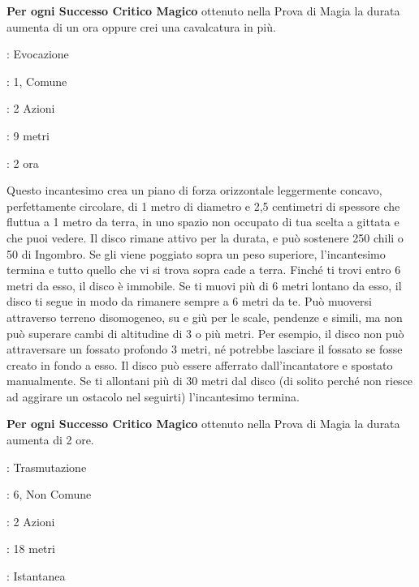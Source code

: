 \begin{multicols}{2}
\textbf{Per ogni Successo Critico Magico} ottenuto nella Prova di Magia la durata aumenta di un ora oppure crei una cavalcatura in più.

\noindent\colorbox{OBSSgold!10}{
\begin{minipage}{0.95\linewidth}
\begin{description}[noitemsep, topsep=0pt, parsep=0pt, partopsep=0pt, leftmargin=0cm, labelwidth=1.3cm]
	\item[\textbf{Lista}]: Evocazione
	\item[\textbf{Livello}]: 1, Comune
	\item[\textbf{Lancio}]: 2 Azioni
	\item[\textbf{Gittata}]: 9 metri
	\item[\textbf{Durata}]: 2 ora
\end{description}
\end{minipage}}\smallskip

Questo incantesimo crea un piano di forza orizzontale leggermente concavo, perfettamente circolare, di 1 metro di diametro e 2,5 centimetri di spessore che fluttua a 1 metro da terra, in uno spazio non occupato di tua scelta a gittata e che puoi vedere. Il disco rimane attivo per la durata, e può sostenere 250 chili o 50 di Ingombro. Se gli viene poggiato sopra un peso superiore, l'incantesimo termina e tutto quello che vi si trova sopra cade a terra. Finché ti trovi entro 6 metri da esso, il disco è immobile. Se ti muovi più di 6 metri lontano da esso, il disco ti segue in modo da rimanere sempre a 6 metri da te. Può muoversi attraverso terreno disomogeneo, su e giù per le scale, pendenze e simili, ma non può superare cambi di altitudine di 3 o più metri. Per esempio, il disco non può attraversare un fossato profondo 3 metri, né potrebbe lasciare il fossato se fosse creato in fondo a esso. Il disco può essere afferrato dall'incantatore e spostato manualmente. Se ti allontani più di 30 metri dal disco (di solito perché non riesce ad aggirare un ostacolo nel seguirti) l'incantesimo termina.

\textbf{Per ogni Successo Critico Magico} ottenuto nella Prova di Magia la durata aumenta di 2 ore.

\noindent\colorbox{OBSSgold!10}{
\begin{minipage}{0.95\linewidth}
\begin{description}[noitemsep, topsep=0pt, parsep=0pt, partopsep=0pt, leftmargin=0cm, labelwidth=1.3cm]
	\item[\textbf{Lista}]: Trasmutazione
	\item[\textbf{Livello}]: 6, Non Comune
	\item[\textbf{Lancio}]: 2 Azioni
	\item[\textbf{Gittata}]: 18 metri
	\item[\textbf{Durata}]: Istantanea
\end{description}
\end{minipage}}\smallskip


\end{multicols}
